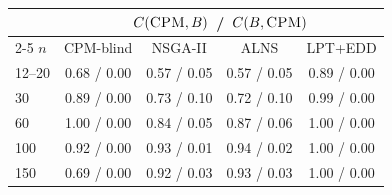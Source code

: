 \begin{tabular}{@{}lcccc@{}}
\toprule
 & \multicolumn{4}{c}{$C(\textsc{CPM}, B)$ \,/\, $C(B, \textsc{CPM})$} \\
\cmidrule(l){2-5}
$n$ & CPM-blind & NSGA-II & ALNS & LPT+EDD \\
\midrule
12--20 & 0.68 / 0.00 & 0.57 / 0.05 & 0.57 / 0.05 & 0.89 / 0.00 \\
30 & 0.89 / 0.00 & 0.73 / 0.10 & 0.72 / 0.10 & 0.99 / 0.00 \\
60 & 1.00 / 0.00 & 0.84 / 0.05 & 0.87 / 0.06 & 1.00 / 0.00 \\
100 & 0.92 / 0.00 & 0.93 / 0.01 & 0.94 / 0.02 & 1.00 / 0.00 \\
150 & 0.69 / 0.00 & 0.92 / 0.03 & 0.93 / 0.03 & 1.00 / 0.00 \\
\bottomrule
\end{tabular}
